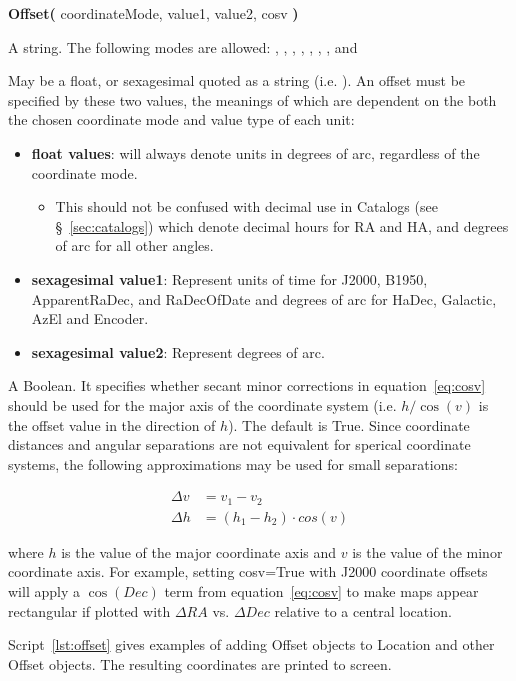\begin{description}[itemsep=1pt]
\item[{\bf SYNTAX}:]
{\bfseries{\textcolor{pythonKeywords}{Offset}}(}
coordinateMode, value1, value2, cosv
{\bf)}
\item[coordinateMode] A string.  The following modes are allowed:
, , , , ,
, , and 
\item[value1, value2] May be a float, or sexagesimal quoted as a string (i.e.
).  An offset must be specified by these two values, the meanings of
which are dependent on the both the chosen coordinate mode and value type of each unit:
\begin{itemize}
\item {\bf float values}: will always denote units in degrees of arc, regardless
of the coordinate mode.
\begin{itemize}
\item This should not be confused with decimal use in Catalogs
(see \S~\ref{sec:catalogs}) which denote decimal hours for RA and HA, and
degrees of arc for all other angles.
\end{itemize}
\item {\bf sexagesimal value1}: Represent units of time for J2000, B1950, ApparentRaDec,
and RaDecOfDate and degrees of arc for HaDec, Galactic, AzEl and Encoder.
\item {\bf sexagesimal value2}: Represent degrees of arc.
\end{itemize}
\item[cosv] A Boolean. It specifies whether secant minor corrections in
equation~\ref{eq:cosv} should be used for the major axis of the coordinate system
(i.e. $h/\cos(v)$ is the offset value in the direction of $h$).  The default is
True.  Since coordinate distances and angular separations are not equivalent for
sperical coordinate systems, the following approximations may be used for small
separations:

\vspace{-0.5cm}
\begin{align}
\Delta v& = v_{1} - v_{2} \\
\Delta h & = (h_1 - h_2)\cdot cos(v)
\label{eq:cosv}
\end{align}

where $h$ is the value of the major coordinate axis and $v$ is the value of the minor
coordinate axis.  For example, setting cosv=True with J2000 coordinate offsets will apply a
$\cos(Dec)$ term from equation~\ref{eq:cosv} to make maps appear rectangular if plotted
with $\Delta RA$ vs. $\Delta Dec$ relative to a central location.

\item[{\bf USAGE}:] Script~\ref{lst:offset} gives examples of adding Offset objects to
Location and other Offset objects.  The resulting coordinates are printed to screen.
\end{description}


